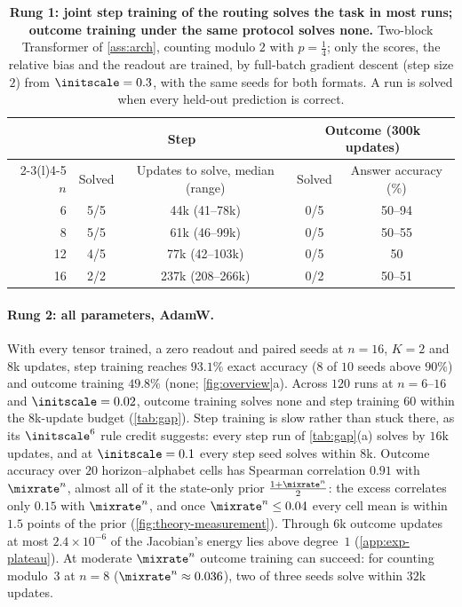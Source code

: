 \begin{table}[t]
\caption{\textbf{Rung 1: joint step training of the routing solves the task in most runs; outcome training under the same protocol solves
none.} Two-block Transformer of \cref{ass:arch}, counting modulo $2$ with $p=\tfrac{1}{4}$; only the scores, the relative bias and the
readout are trained, by full-batch gradient descent (step size $2$) from $\initscale=0.3$, with the same seeds for both formats. A run is
solved when every held-out prediction is correct.}
\label{tab:reach}
\centering\small
\begin{tabular}{@{}rcccc@{}}
\toprule
 & \multicolumn{2}{c}{Step} & \multicolumn{2}{c}{Outcome (300k updates)}\\
\cmidrule(lr){2-3}\cmidrule(l){4-5}
$n$ & Solved & Updates to solve, median (range) & Solved & Answer accuracy (\%)\\
\midrule
6  & 5/5 & 44k (41--78k)   & 0/5 & 50--94\\
8  & 5/5 & 61k (46--99k)   & 0/5 & 50--55\\
12 & 4/5 & 77k (42--103k)  & 0/5 & 50\\
16 & 2/2 & 237k (208--266k) & 0/2 & 50--51\\
\bottomrule
\end{tabular}
\end{table}

\paragraph{Rung 2: all parameters, AdamW.} With every tensor trained, a zero readout and paired seeds at $n=16$, $K=2$ and $8$k
updates, step training reaches $93.1\%$ exact accuracy ($8$ of $10$ seeds above $90\%$) and outcome training $49.8\%$ (none;
\cref{fig:overview}a). Across $120$ runs at $n=6$--$16$ and $\initscale=0.02$, outcome training solves none and step training $60$ within the $8$k-update budget
(\cref{tab:gap}). Step training is slow rather than stuck there, as its $\initscale^6$ rule credit suggests: every step run of
\cref{tab:gap}(a) solves by $16$k updates, and at $\initscale=0.1$ every step seed solves within $8$k. Outcome
accuracy over $20$ horizon--alphabet cells has Spearman correlation $0.91$ with $\mixrate^n$, almost all of it the state-only prior
$\frac{1+\mixrate^n}{2}$: the excess correlates only $0.15$ with $\mixrate^n$, and once $\mixrate^n\le0.04$ every cell mean is within $1.5$
points of the prior (\cref{fig:theory-measurement}). Through $6$k outcome updates at most $2.4\times10^{-6}$ of the Jacobian's energy
lies above degree~$1$ (\cref{app:exp-plateau}). At moderate $\mixrate^n$ outcome training can succeed: for counting modulo~$3$ at $n=8$
($\mixrate^n\approx0.036$), two of three seeds solve within $32$k updates.

